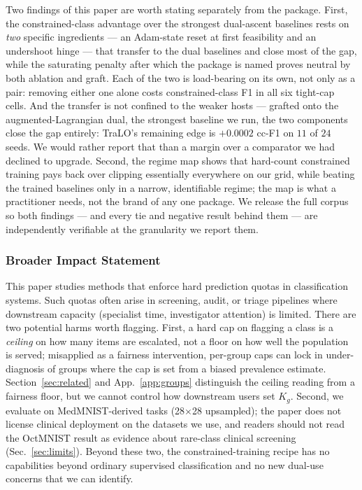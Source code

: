 \documentclass[10pt]{article}
\begin{document}
Two findings of this paper are worth stating separately from the
package. First, the constrained-class advantage over the strongest
dual-ascent baselines rests on \emph{two} specific ingredients --- an
Adam-state reset at first feasibility and an undershoot hinge --- that
transfer to the dual baselines and close most of the gap, while the
saturating penalty after which the package is named proves neutral by
both ablation and graft.{\color{blue} Each of the two is load-bearing on its own,
not only as a pair: removing either one alone costs constrained-class F1 in all
six tight-cap cells. And the transfer is not confined to the weaker hosts ---
grafted onto the augmented-Lagrangian dual, the strongest baseline we run, the
two components close the gap entirely: TraLO's remaining edge is $+0.0002$ cc-F1
on $11$ of $24$ seeds. We would rather report that than a margin over a
comparator we had declined to upgrade.} Second, the regime map shows that hard-count
constrained training pays back over clipping essentially everywhere on
our grid, while beating the trained baselines only in a narrow,
identifiable regime; the map is what a practitioner needs, not the
brand of any one package. We release the full corpus so both findings
--- and every tie and negative result behind them --- are independently
verifiable at the granularity we report them.

\subsubsection*{Broader Impact Statement}
This paper studies methods that enforce hard prediction quotas in
classification systems. Such quotas often arise in screening, audit, or
triage pipelines where downstream capacity (specialist time, investigator
attention) is limited. There are two potential harms worth flagging.
First, a hard cap on flagging a class is a \emph{ceiling} on how many
items are escalated, not a floor on how well the population is served;
misapplied as a fairness intervention, per-group caps can lock in
under-diagnosis of groups where the cap is set from a biased prevalence
estimate. Section~\ref{sec:related} and App.~\ref{app:groups} distinguish
the ceiling reading from a fairness floor, but we cannot control how
downstream users set $K_g$. Second, we evaluate on MedMNIST-derived
tasks (28$\times$28 upsampled); the paper does not license clinical
deployment on the datasets we use, and readers should not read the
OctMNIST result as evidence about rare-class clinical screening
(Sec.~\ref{sec:limits}). Beyond these two, the constrained-training
recipe has no capabilities beyond ordinary supervised classification and
no new dual-use concerns that we can identify.
\end{document}
